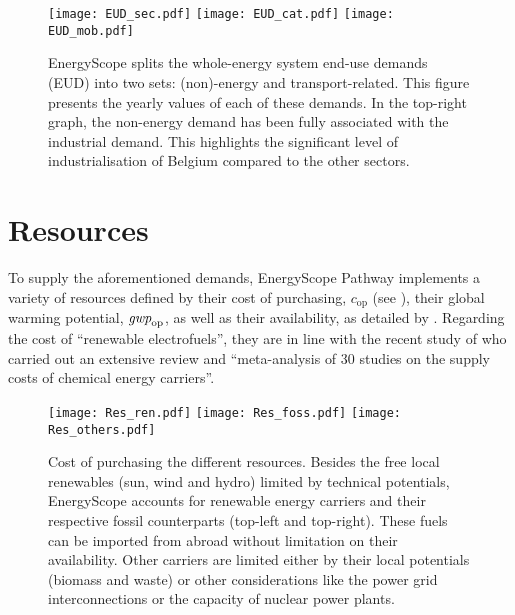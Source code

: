 \begin{figure}[htbp!]
\centering
\texttt{[image: EUD\_sec.pdf]}
\texttt{[image: EUD\_cat.pdf]}
\texttt{[image: EUD\_mob.pdf]}
\caption{EnergyScope splits the whole-energy system end-use demands (EUD) into two sets: (non)-energy and transport-related. This figure presents the yearly values of each of these demands. In the top-right graph, the non-energy demand has been fully associated with the industrial demand. This highlights the significant level of industrialisation of Belgium compared to the other sectors.}
\label{fig:cs_demands}
\end{figure}


\section{Resources}
\label{sec:cs:resources}
To supply the aforementioned demands, EnergyScope Pathway implements a variety of resources defined by their cost of purchasing, $\mathit{c}_{\mathrm{op}}$ (see ), their global warming potential, $\emph{gwp}_{\mathrm{op}}$, as well as their 
availability, as detailed by \citet{limpens2024pathway}. Regarding the cost of ``renewable electrofuels'', they are in line with the recent study of \citet{genge2023supply} who carried out an extensive review and ``meta-analysis \cite{grant2009typology,page2021prisma} of 30 studies on the supply costs of chemical energy carriers''. 

\begin{figure}[htbp!]
\centering
\texttt{[image: Res\_ren.pdf]}
\texttt{[image: Res\_foss.pdf]}
\texttt{[image: Res\_others.pdf]}
\caption{Cost of purchasing the different resources. Besides the free local renewables (\ie sun, wind and hydro) limited by technical potentials, EnergyScope accounts for renewable energy carriers and their respective fossil counterparts (top-left and top-right). These fuels can be imported from abroad without limitation on their availability. Other carriers are limited either by their local potentials (\ie biomass and waste) or other considerations like the power grid interconnections or the capacity of nuclear power plants.}
\label{fig:cs_resources_cost}
\end{figure}

